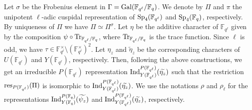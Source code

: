 \documentclass[10pt, reqno]{amsart}
\theoremstyle{plain}
\numberwithin{equation}{section} \newcommand{\di}{\operatorname{dim}}
\begin{document}
\subsection{}
Let $\sigma$ be the Frobenius element in
${\Gamma = \rm Gal}(\mathbb{F}_{q^\ell} /\mathbb{F}_q)$. We denote by
$\Pi$ and $\pi$ the unipotent $\ell$-adic cuspidal representation of
${\rm Sp}_4(\mathbb{F}_{q^\ell})$ and ${\rm Sp}_4(\mathbb{F}_q)$,
respectively. By uniqueness of $\Pi$ we have $\Pi\simeq
\Pi^\sigma$. Let $\eta$ be the additive character of
$\mathbb{F}_{q^\ell}$ given by the composition
$\psi\circ {\rm Tr}_{\mathbb{F}_{q^\ell}/\mathbb{F}_q}$, where
${\rm Tr}_{\mathbb{F}_{q^\ell}/\mathbb{F}_q}$ is the trace
function. Since $\ell$ is odd, we have
$\tau\in \mathbb{F}_{q^\ell} ^\times\setminus
(\mathbb{F}_{q^\ell}^\times)^2$. Let $\eta_z$ and $\widetilde{\eta}_z$
be the corresponding characters of $U(\mathbb{F}_{q^\ell})$ and
$Y(\mathbb{F}_{q^\ell})$, respectively.  Then, following the above
constructions, we get an irreducible $P(\mathbb{F}_{q^\ell})$
representation
${\rm Ind}_{Y(\mathbb{F}_{q^\ell})} ^{P(\mathbb{F}_{q^\ell})}
(\widetilde{\eta_z})$ such that the restriction
${\rm res}_ {P(\mathbb{F}_{q^\ell})}(\Pi)$ is isomorphic to
${\rm Ind}_{Y(\mathbb{F}_{q^l})}^{P(\mathbb{F}_{q^\ell})}
(\widetilde{\eta_z})$. We use the notations $\rho$ and $\rho_\ell$ for
the representations
${\rm Ind}_{Y(\mathbb{F}_q)} ^{P(\mathbb{F}_q)} (\widetilde{\psi_z})$
and
${\rm Ind}_{Y(\mathbb{F}_{q^\ell})}^{P(\mathbb{F}_{q^\ell})}
(\widetilde{\eta_z})$, respectively.
\end{document}
